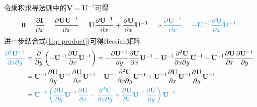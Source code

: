 \documentclass{ctexart}
\newcommand{\blue}[1]{\textcolor{Solarized-blue}{#1}}
\theoremstyle{definition}
\def \zerov {\bm{0}}
\def \Iv {\mathbf{I}}
\def \Uv {\mathbf{U}}
\def \Vv {\mathbf{V}}
\begin{document}
令乘积求导法则中的$\Vv = \Uv^{-1}$可得
\begin{align} \label{eq: inverse}
    \zerov = \frac{\partial \Iv}{\partial x} = \frac{\partial \Uv \Uv^{-1}}{\partial x} = \Uv \frac{\partial \Uv^{-1}}{\partial x} + \frac{\partial \Uv}{\partial x} \Uv^{-1} \Longrightarrow \blue{\frac{\partial \Uv^{-1}}{\partial x} = - \Uv^{-1} \frac{\partial \Uv}{\partial x} \Uv^{-1}}
\end{align}
进一步结合式(\ref{eq: product})可得Hessian矩阵
\begin{align*}
    \blue{\frac{\partial^2 \Uv^{-1}}{\partial x \partial y}} & = \frac{\partial}{\partial y} \left( - \Uv^{-1} \frac{\partial \Uv}{\partial x} \Uv^{-1} \right) = - \frac{\partial \Uv^{-1}}{\partial y} \frac{\partial \Uv}{\partial x} \Uv^{-1} - \Uv^{-1} \frac{\partial^2 \Uv}{\partial x \partial y} \Uv^{-1} - \Uv^{-1} \frac{\partial \Uv}{\partial x} \frac{\partial \Uv^{-1}}{\partial y} \\
                                                             & = \Uv^{-1} \frac{\partial \Uv}{\partial y} \Uv^{-1} \frac{\partial \Uv}{\partial x} \Uv^{-1} - \Uv^{-1} \frac{\partial^2 \Uv}{\partial x \partial y} \Uv^{-1} + \Uv^{-1} \frac{\partial \Uv}{\partial x} \Uv^{-1} \frac{\partial \Uv}{\partial y} \Uv^{-1}                                                                          \\
                                                             & = \blue{\Uv^{-1} \left( \frac{\partial \Uv}{\partial y} \Uv^{-1} \frac{\partial \Uv}{\partial x} - \frac{\partial^2 \Uv}{\partial x \partial y} + \frac{\partial \Uv}{\partial x} \Uv^{-1} \frac{\partial \Uv}{\partial y} \right) \Uv^{-1}}
\end{align*}
\end{document}
